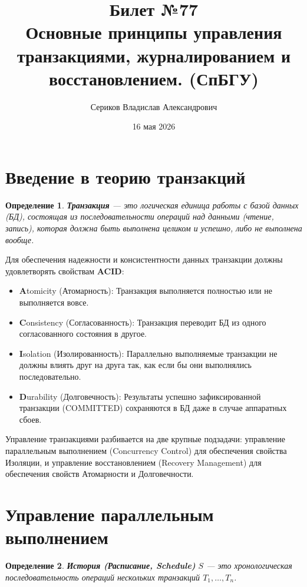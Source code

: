 \documentclass[a4paper,12pt]{article}
\title{Билет №77 \\ \small Основные принципы управления транзакциями, журналированием и восстановлением. (СпБГУ)}
\author{Сериков Владислав Александрович}
\date{16 мая 2026}
\newtheorem{definition}{Определение}
\begin{document}
\maketitle
\tableofcontents
\newpage

\section{Введение в теорию транзакций}

\begin{definition}
\textbf{Транзакция} — это логическая единица работы с базой данных (БД), состоящая из последовательности операций над данными (чтение, запись), которая должна быть выполнена целиком и успешно, либо не выполнена вообще.
\end{definition}

Для обеспечения надежности и консистентности данных транзакции должны удовлетворять свойствам \textbf{ACID}:
\begin{itemize}
    \item \textbf{A}tomicity (Атомарность): Транзакция выполняется полностью или не выполняется вовсе.
    \item \textbf{C}onsistency (Согласованность): Транзакция переводит БД из одного согласованного состояния в другое.
    \item \textbf{I}solation (Изолированность): Параллельно выполняемые транзакции не должны влиять друг на друга так, как если бы они выполнялись последовательно.
    \item \textbf{D}urability (Долговечность): Результаты успешно зафиксированной транзакции (COMMITTED) сохраняются в БД даже в случае аппаратных сбоев.
\end{itemize}

Управление транзакциями разбивается на две крупные подзадачи: управление параллельным выполнением (Concurrency Control) для обеспечения свойства Изоляции, и управление восстановлением (Recovery Management) для обеспечения свойств Атомарности и Долговечности.

\section{Управление параллельным выполнением}

\begin{definition}
\textbf{История (Расписание, Schedule)} $S$ — это хронологическая последовательность операций нескольких транзакций $T_1, \dots, T_n$.
\end{definition}
\end{document}
